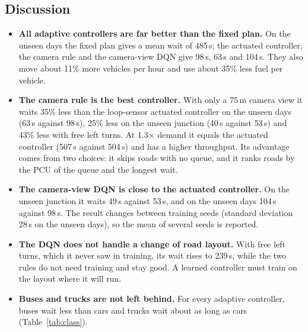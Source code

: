 \subsection{Discussion}
\begin{itemize}
  \item \textbf{All adaptive controllers are far better than the fixed plan.} On the unseen days
        the fixed plan gives a mean wait of 485\,s; the actuated controller, the camera rule and
        the camera-view DQN give 98\,s, 63\,s and 104\,s. They also move about 11\% more vehicles
        per hour and use about 35\% less fuel per vehicle.
  \item \textbf{The camera rule is the best controller.} With only a 75\,m camera view it waits
        35\% less than the loop-sensor actuated controller on the unseen days (63\,s against
        98\,s), 25\% less on the unseen junction (40\,s against 53\,s) and 43\% less with free
        left turns. At 1.3$\times$ demand it equals the actuated controller (507\,s against 504\,s)
        and has a higher throughput. Its advantage comes from two choices: it skips roads with no
        queue, and it ranks roads by the PCU of the queue and the longest wait.
  \item \textbf{The camera-view DQN is close to the actuated controller.} On the unseen junction it
        waits 49\,s against 53\,s, and on the unseen days 104\,s against 98\,s. The result changes
        between training seeds (standard deviation 28\,s on the unseen days), so the mean of
        several seeds is reported.
  \item \textbf{The DQN does not handle a change of road layout.} With free left turns, which it
        never saw in training, its wait rises to 239\,s, while the two rules do not need training
        and stay good. A learned controller must train on the layout where it will run.
  \item \textbf{Buses and trucks are not left behind.} For every adaptive controller, buses wait
        less than cars and trucks wait about as long as cars (Table~\ref{tab:class}).
\end{itemize}
